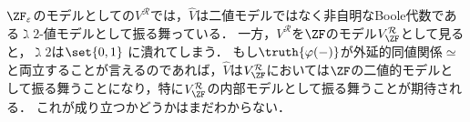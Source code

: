 \documentclass[realisability.tex]{subfiles}
\begin{document}
$\ZFe$のモデルとしての$V^{\mathcal{R}}$では，$\hat{V}$は二値モデルではなく非自明なBoole代数である$\gimel 2$-値モデルとして振る舞っている．
一方，$V^{\mathcal{R}}$を$\ZF$のモデル$V^{\mathcal{R}}_{\ZF}$として見ると，$\gimel 2$は$\set{0, 1}$ に潰れてしまう．
もし$\truth{\varphi(-)}$が外延的同値関係$\simeq$と両立することが言えるのであれば，$\hat{V}$は$V^{\mathcal{R}}_{\ZF}$においては$\ZF$の二値的モデルとして振る舞うことになり，特に$V^{\mathcal{R}}_{\ZF}$の内部モデルとして振る舞うことが期待される．
これが成り立つかどうかはまだわからない．
\nocite{Kamo:2007}
\end{document}

